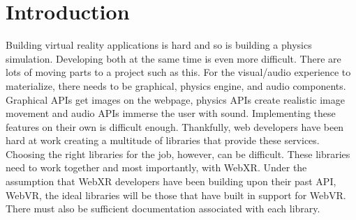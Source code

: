 \section{Introduction}
Building virtual reality applications is hard and so is building a physics simulation. Developing both at the same time is even more difficult. There are lots of moving parts to a project such as this. For the visual/audio experience to materialize, there needs to be graphical, physics engine, and audio components. Graphical APIs get images on the webpage, physics APIs create realistic image movement and audio APIs immerse the user with sound. Implementing these features on their own is difficult enough. Thankfully, web developers have been hard at work creating a multitude of libraries that provide these services. Choosing the right libraries for the job, however, can be difficult. These libraries need to work together and most importantly, with WebXR. Under the assumption that WebXR developers have been building upon their past API, WebVR, the ideal libraries will be those that have built in support for WebVR. There must also be sufficient documentation associated with each library.
